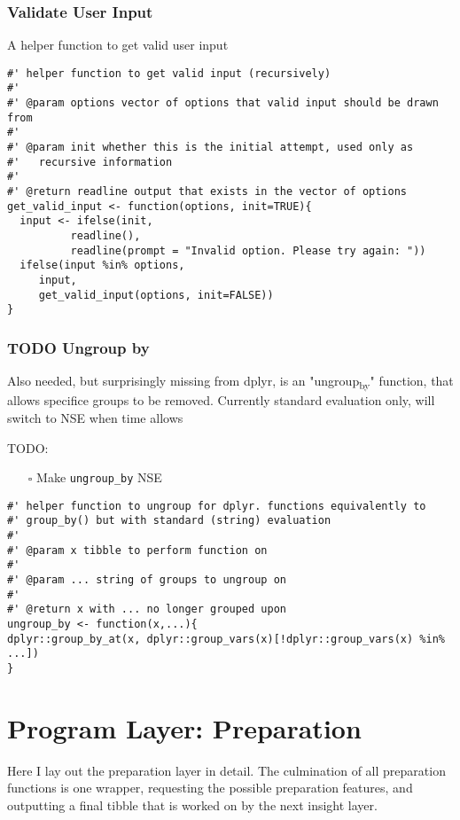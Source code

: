\documentclass[a4paper, 11pt]{article}
\begin{document}
\subsubsection{Validate User Input}
\label{sec:org2dd6bbd}
A helper function to get valid user input
\begin{verbatim}
#' helper function to get valid input (recursively)
#'
#' @param options vector of options that valid input should be drawn from
#'
#' @param init whether this is the initial attempt, used only as
#'   recursive information
#'
#' @return readline output that exists in the vector of options
get_valid_input <- function(options, init=TRUE){
  input <- ifelse(init,
		  readline(),
		  readline(prompt = "Invalid option. Please try again: "))
  ifelse(input %in% options,
	 input,
	 get_valid_input(options, init=FALSE))
}
\end{verbatim}
\subsubsection{{\bfseries\sffamily TODO} Ungroup by}
\label{sec:orgeedf7b6}
Also needed, but surprisingly missing from dplyr, is an "ungroup\textsubscript{by}"
function, that allows specifice groups to be removed. Currently
standard evaluation only, will switch to NSE when time allows

TODO:
\begin{itemize}
\item[{$\square$}] Make \texttt{ungroup\_by} NSE
\end{itemize}
\begin{verbatim}
#' helper function to ungroup for dplyr. functions equivalently to
#' group_by() but with standard (string) evaluation
#'
#' @param x tibble to perform function on
#'
#' @param ... string of groups to ungroup on
#'
#' @return x with ... no longer grouped upon
ungroup_by <- function(x,...){
dplyr::group_by_at(x, dplyr::group_vars(x)[!dplyr::group_vars(x) %in% ...])
}
\end{verbatim}
\section{Program Layer: Preparation}
\label{sec:org71d6bea}
Here I lay out the preparation layer in detail. The culmination of all
preparation functions is one wrapper, requesting the possible
preparation features, and outputting a final tibble that is worked on
by the next insight layer.
\end{document}
